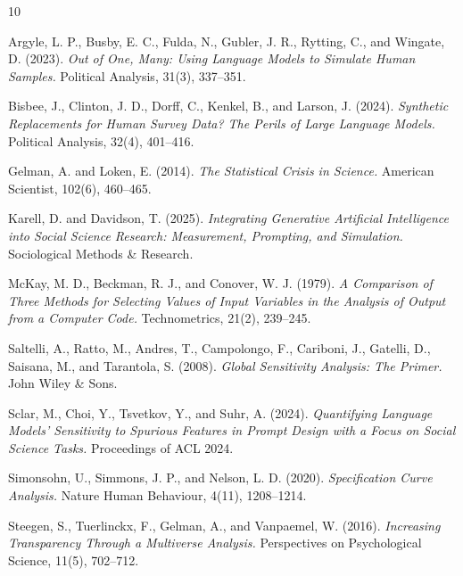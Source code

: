 \documentclass[10pt]{article}
\begin{document}
\begin{thebibliography}{10}
\small\setlength{\itemsep}{1pt}

Argyle, L. P., Busby, E. C., Fulda, N., Gubler, J. R., Rytting, C., and Wingate, D. (2023).
\textit{Out of One, Many: Using Language Models to Simulate Human Samples.}
Political Analysis, 31(3), 337--351.

Bisbee, J., Clinton, J. D., Dorff, C., Kenkel, B., and Larson, J. (2024).
\textit{Synthetic Replacements for Human Survey Data? The Perils of Large Language Models.}
Political Analysis, 32(4), 401--416.

Gelman, A. and Loken, E. (2014).
\textit{The Statistical Crisis in Science.}
American Scientist, 102(6), 460--465.

Karell, D. and Davidson, T. (2025).
\textit{Integrating Generative Artificial Intelligence into Social Science Research: Measurement, Prompting, and Simulation.}
Sociological Methods \& Research.

McKay, M. D., Beckman, R. J., and Conover, W. J. (1979).
\textit{A Comparison of Three Methods for Selecting Values of Input Variables in the Analysis of Output from a Computer Code.}
Technometrics, 21(2), 239--245.

Saltelli, A., Ratto, M., Andres, T., Campolongo, F., Cariboni, J., Gatelli, D., Saisana, M., and Tarantola, S. (2008).
\textit{Global Sensitivity Analysis: The Primer.}
John Wiley \& Sons.

Sclar, M., Choi, Y., Tsvetkov, Y., and Suhr, A. (2024).
\textit{Quantifying Language Models' Sensitivity to Spurious Features in Prompt Design with a Focus on Social Science Tasks.}
Proceedings of ACL 2024.

Simonsohn, U., Simmons, J. P., and Nelson, L. D. (2020).
\textit{Specification Curve Analysis.}
Nature Human Behaviour, 4(11), 1208--1214.

Steegen, S., Tuerlinckx, F., Gelman, A., and Vanpaemel, W. (2016).
\textit{Increasing Transparency Through a Multiverse Analysis.}
Perspectives on Psychological Science, 11(5), 702--712.

\end{thebibliography}
\end{document}
